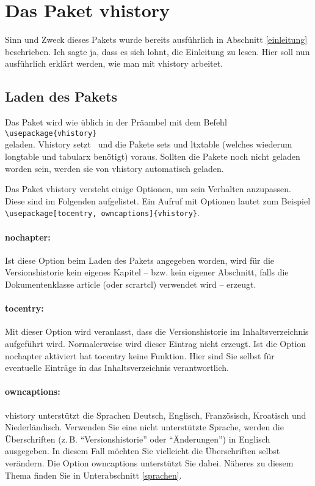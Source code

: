\section{Das Paket vhistory}
Sinn und Zweck dieses Pakets wurde bereits ausführlich in Abschnitt \ref{einleitung} beschrieben. Ich sagte ja, dass es sich lohnt, die Einleitung zu lesen. Hier soll nun ausführlich erklärt werden, wie man mit vhistory arbeitet.

\subsection{Laden des Pakets}\label{laden}
Das Paket wird wie üblich in der Präambel mit dem Befehl\\
\mbox{}\hspace{2em}\verb|\usepackage{vhistory}|\\
geladen. Vhistory setzt \LaTeXe\ und die Pakete sets und ltxtable (welches wiederum longtable und tabularx benötigt) voraus. Sollten die Pakete noch nicht geladen worden sein, werden sie von vhistory automatisch geladen.

Das Paket vhistory versteht einige Optionen, um sein Verhalten anzupassen. Diese sind im Folgenden aufgelistet. Ein Aufruf mit Optionen lautet zum Beispiel\\
\mbox{}\hspace{2em}\verb|\usepackage[tocentry, owncaptions]{vhistory}|.

\paragraph{nochapter:} Ist diese Option beim Laden des Pakets angegeben worden, wird für die Versionshistorie kein eigenes Kapitel -- bzw. kein eigener Abschnitt, falls die Dokumentenklasse article (oder scrartcl) verwendet wird -- erzeugt.

\paragraph{tocentry:} Mit dieser Option wird veranlasst, dass die Versionshistorie im Inhaltsverzeichnis aufgeführt wird. Normalerweise wird dieser Eintrag nicht erzeugt. Ist die Option nochapter aktiviert hat tocentry keine Funktion. Hier sind Sie selbst für eventuelle Einträge in das Inhaltsverzeichnis verantwortlich.

\paragraph{owncaptions:} vhistory unterstützt die Sprachen Deutsch, Englisch, Französisch, Kroatisch und Niederländisch. Verwenden Sie eine nicht unterstützte Sprache, werden die Überschriften (z.\,B. "`Versionshistorie"' oder "`Änderungen"') in Englisch ausgegeben. In diesem Fall möchten Sie vielleicht die Überschriften selbst verändern. Die Option own\-capt\-ions unterstützt Sie dabei. Näheres zu diesem Thema finden Sie in Unterabschnitt \ref{sprachen}.

